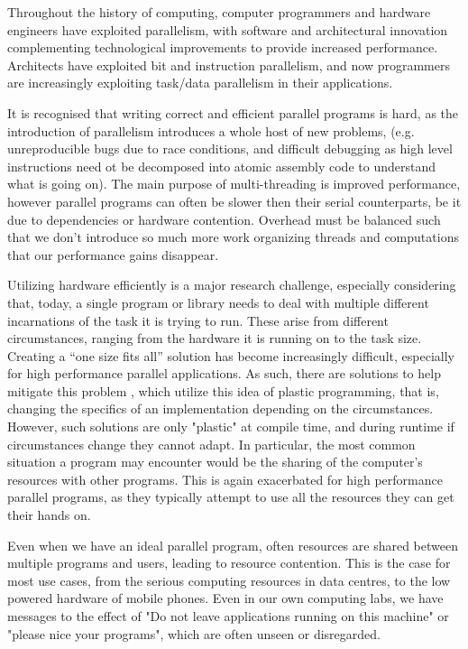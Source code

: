 
Throughout the history of computing, computer programmers and hardware engineers have exploited parallelism, with software and architectural innovation complementing technological improvements to provide increased performance. Architects have exploited bit and instruction parallelism, and now programmers are increasingly exploiting task/data parallelism in their applications.

It is recognised that writing correct and efficient parallel programs is hard, \cite {parallel_challenges} as the introduction of parallelism introduces a whole host of new problems, (e.g. unreproducible bugs due to race conditions, and difficult debugging as high level instructions need ot be decomposed  into atomic assembly code to understand what is going on). The main purpose of multi-threading is improved performance, however parallel programs can often be slower then their serial counterparts, be it due to dependencies or hardware contention. Overhead must be balanced such that we don't introduce so much more work organizing threads and computations that our performance gains disappear.

Utilizing hardware efficiently is a major research challenge, especially considering that, today, a single program or library needs to deal with multiple different incarnations of the task it is trying to run. These arise from different circumstances, ranging from the hardware it is running on to the task size. Creating a ``one size fits all'' solution has become increasingly difficult, especially for high performance parallel applications. As such, there are solutions to help mitigate this problem \cite{petabricks}, which utilize this idea of plastic programming, that is, changing the specifics of an implementation depending on the circumstances. However, such solutions are only "plastic" at compile time, and during runtime if circumstances change they cannot adapt. In particular, the most common situation a program may encounter would be the sharing of the computer's resources with other programs. This is again exacerbated for high performance parallel programs, as they typically attempt to use all the resources they can get their hands on.

Even when we have an ideal parallel program, often resources are shared between multiple programs and users, leading to resource contention. This is the case for most use cases, from the serious computing resources in data centres, to the low powered hardware of mobile phones. Even in our own computing labs, we have messages to the effect of "Do not leave applications running on this machine" or "please nice your programs", which are often unseen or disregarded.

